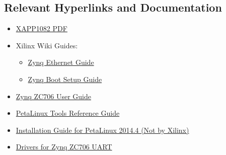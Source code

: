 \documentclass[12pt]{report}
\begin{document}
\subsection{Relevant Hyperlinks and Documentation}
\begin{itemize}
  \item \href{http://www.xilinx.com/support/documentation/application_notes/xapp1082-zynq-eth.pdf}{XAPP1082 PDF}
  \item Xilinx Wiki Guides:
    \begin{itemize}
    \item \href{http://www.wiki.xilinx.com/Zynq+PL+Ethernet}{Zynq Ethernet Guide}
    \item \href{http://www.wiki.xilinx.com/Prepare+Boot+Medium}{Zynq Boot Setup Guide}
    \end{itemize}
  \item \href{http://www.xilinx.com/support/documentation/boards_and_kits/zc706/ug954-zc706-eval-board-xc7z045-ap-soc.pdf}{Zynq ZC706 User Guide}
  \item \href{http://www.xilinx.com/support/documentation/sw_manuals/petalinux2014_4/ug1144-petalinux-tools-reference-guide.pdf}{PetaLinux Tools Reference Guide}
  \item \href{http://www.syfer.com.au/assets/s502-00000-a.pdf}{Installation Guide for PetaLinux 2014.4 (Not by Xilinx)}
  \item \href{http://www.silabs.com/products/mcu/Pages/USBtoUARTBridgeVCPDrivers.aspx}{Drivers for Zynq ZC706 UART}
\end{itemize}
\end{document}
